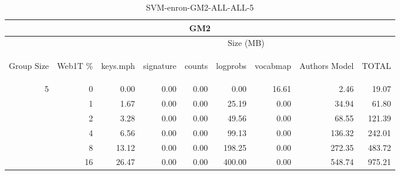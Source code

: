 \begin{center}
\begin{table}[htbp] 
 \begin{center}
\begin{tabular}{ | r | r | r | r | r | r | r | r | r |}
\hline
\multicolumn{9}{|c|}{GM2}\\
\hline
 & & \multicolumn{7}{|c|}{Size (MB)}\\ \cline{3-9}
\begin{sideways}Group Size\end{sideways} & \begin{sideways}Web1T \% \end{sideways} & \begin{sideways}keys.mph\end{sideways} & \begin{sideways}signature\end{sideways} & \begin{sideways}counts\end{sideways} & \begin{sideways}logprobs\end{sideways} & \begin{sideways}vocabmap\end{sideways} & \begin{sideways}Authors Model \end{sideways} & \begin{sideways}TOTAL\end{sideways}\\
\hline
\multirow{5}{*}{5}
 & 0 & 0.00 & 0.00 & 0.00 & 0.00 & 16.61 & 2.46 & 19.07\\ \cline{2-9}
 & 1 & 1.67 & 0.00 & 0.00 & 25.19 & 0.00 & 34.94 & 61.80\\ \cline{2-9}
 & 2 & 3.28 & 0.00 & 0.00 & 49.56 & 0.00 & 68.55 & 121.39\\ \cline{2-9}
 & 4 & 6.56 & 0.00 & 0.00 & 99.13 & 0.00 & 136.32 & 242.01\\ \cline{2-9}
 & 8 & 13.12 & 0.00 & 0.00 & 198.25 & 0.00 & 272.35 & 483.72\\ \cline{2-9}
 & 16 & 26.47 & 0.00 & 0.00 & 400.00 & 0.00 & 548.74 & 975.21\\ \cline{2-9}
\hline
\end{tabular}
\caption{SVM-enron-GM2-ALL-ALL-5}
\label{table:SVM-enron-GM2-ALL-ALL-5}
\end{center}
 \end{table}
\end{center}

